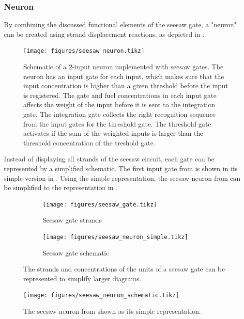 \subsubsection{Neuron}
By combining the discussed functional elements of the seesaw gate, a "neuron" can be created using strand displacement reactions, as depicted in .

\begin{figure}[h]
\texttt{[image: figures/seesaw\_neuron.tikz]}
\caption{Schematic of a 2-input neuron implemented with seesaw gates. The neuron has an input gate for each input, which makes sure that the input concentration is higher than a given threshold before the input is registered. The gate and fuel concentrations in each input gate affects the weight of the input before it is sent to the integration gate. The integration gate collects the right recognition sequence from the input gates for the threshold gate. The threshold gate activates if the sum of the weighted inputs is larger than the threshold concentration of the treshold gate.}
\label{seesaw_neuron}
\end{figure}

Instead of displaying all strands of the seesaw circuit, each gate can be represented by a simplified schematic. The first input gate from  is shown in its simple version in . Using the simple representation, the seesaw neuron from  can be simplified to the representation in .

\begin{figure}[h]
  \begin{subfigure}[t]{.49\textwidth}
    \texttt{[image: figures/seesaw\_gate.tikz]}
    \caption{Seesaw gate strands}
  \end{subfigure}
  \quad
  \begin{subfigure}[t]{.49\textwidth}
    \texttt{[image: figures/seesaw\_neuron\_simple.tikz]}
    \caption{Seesaw gate schematic}
  \end{subfigure}
  \caption{The strands and concentrations of the units of a seesaw gate can be represented to simplify larger diagrams.}
  \label{seesaw_gate_simple}
\end{figure}

\begin{figure}[h]
  \texttt{[image: figures/seesaw\_neuron\_schematic.tikz]}
  \caption{The seesaw neuron from  shown as its simple representation.}
  \label{seesaw_neuron_schematic}
\end{figure}

